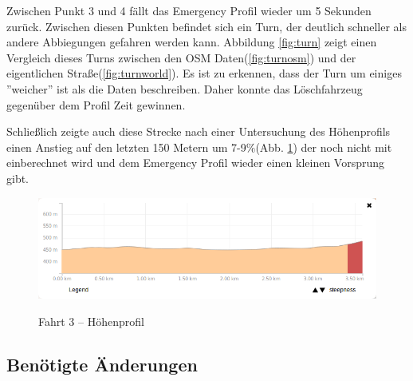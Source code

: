 Zwischen Punkt 3 und 4 fällt das Emergency Profil wieder um 5 Sekunden zurück.
Zwischen diesen Punkten befindet sich ein Turn, der deutlich schneller als andere Abbiegungen gefahren werden kann.
Abbildung \ref{fig:turn} zeigt einen Vergleich dieses Turns zwischen den OSM Daten(\ref{fig:turnosm}) und der eigentlichen Straße(\ref{fig:turnworld}).
Es ist zu erkennen, dass der Turn um einiges ''weicher'' ist als die Daten beschreiben.
Daher konnte das Löschfahrzeug gegenüber dem Profil Zeit gewinnen.

Schließlich zeigte auch diese Strecke nach einer Untersuchung des Höhenprofils einen Anstieg auf den letzten 150 Metern um 7-9$\%$(Abb. \ref{fig:profile2}) der noch nicht mit einberechnet wird und dem Emergency Profil wieder einen kleinen Vorsprung gibt.

\begin{figure}[h]
\centering
\caption{Fahrt 3 -- Höhenprofil}
\label{fig:profile2}
\includegraphics[width = 0.90 \textwidth]{../media/Fahrt3_Profile.png} \\
\end{figure}


\subsection{Benötigte Änderungen}

